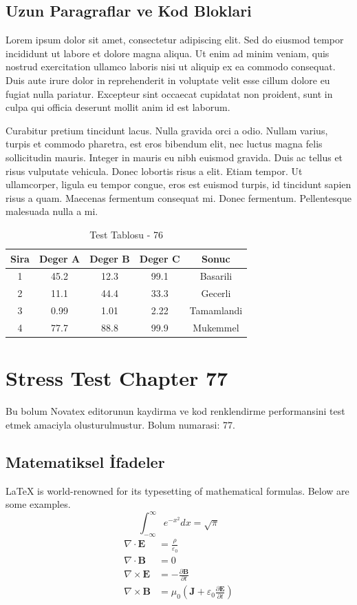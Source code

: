 \documentclass[12pt,a4paper]{article}
\begin{document}
\subsection{Uzun Paragraflar ve Kod Bloklari}
Lorem ipsum dolor sit amet, consectetur adipiscing elit. Sed do eiusmod tempor incididunt ut labore et dolore magna aliqua. Ut enim ad minim veniam, quis nostrud exercitation ullamco laboris nisi ut aliquip ex ea commodo consequat. Duis aute irure dolor in reprehenderit in voluptate velit esse cillum dolore eu fugiat nulla pariatur. Excepteur sint occaecat cupidatat non proident, sunt in culpa qui officia deserunt mollit anim id est laborum.

Curabitur pretium tincidunt lacus. Nulla gravida orci a odio. Nullam varius, turpis et commodo pharetra, est eros bibendum elit, nec luctus magna felis sollicitudin mauris. Integer in mauris eu nibh euismod gravida. Duis ac tellus et risus vulputate vehicula. Donec lobortis risus a elit. Etiam tempor. Ut ullamcorper, ligula eu tempor congue, eros est euismod turpis, id tincidunt sapien risus a quam. Maecenas fermentum consequat mi. Donec fermentum. Pellentesque malesuada nulla a mi.

\begin{table}[h!]
\centering
\begin{tabular}{|c|c|c|c|c|}
\hline
\textbf{Sira} & \textbf{Deger A} & \textbf{Deger B} & \textbf{Deger C} & \textbf{Sonuc} \\
\hline
1 & 45.2 & 12.3 & 99.1 & Basarili \\
2 & 11.1 & 44.4 & 33.3 & Gecerli \\
3 & 0.99 & 1.01 & 2.22 & Tamamlandi \\
4 & 77.7 & 88.8 & 99.9 & Mukemmel \\
\hline
\end{tabular}
\caption{Test Tablosu - 76}
\end{table}

\newpage
\section{Stress Test Chapter 77}
Bu bolum Novatex editorunun kaydirma ve kod renklendirme performansini test etmek amaciyla olusturulmustur. Bolum numarasi: 77.

\subsection{Matematiksel İfadeler}
\LaTeX{} is world-renowned for its typesetting of mathematical formulas. Below are some examples.
\begin{equation}
\int_{-\infty}^{\infty} e^{-x^2} dx = \sqrt{\pi}
\end{equation}
\begin{align}
\nabla \cdot \mathbf{E} &= \frac{\rho}{\varepsilon_0} \\
\nabla \cdot \mathbf{B} &= 0 \\
\nabla \times \mathbf{E} &= -\frac{\partial \mathbf{B}}{\partial t} \\
\nabla \times \mathbf{B} &= \mu_0\left(\mathbf{J} + \varepsilon_0 \frac{\partial \mathbf{E}}{\partial t}\right)
\end{align}
\end{document}
